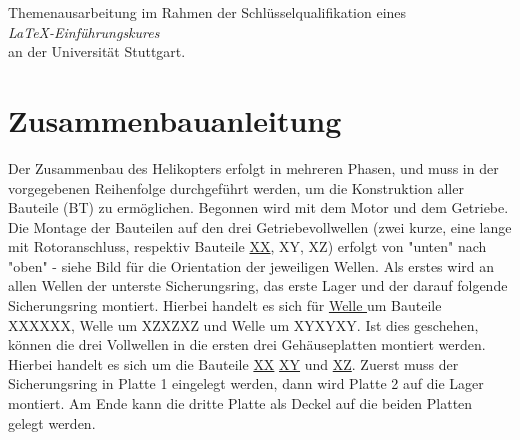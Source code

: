 \documentclass[11pt, a4paper]{scrartcl}
\newcommand*{\rom}[1]{\expandafter\uppercase\expandafter{\romannumeral #1 \relax}}
\begin{document}
\begin{center}
    Themenausarbeitung im Rahmen der Schlüsselqualifikation eines\\ \emph{\LaTeX-Einführungskures}\\ an der Universität Stuttgart.
    \vspace{1cm}\\
\end{center}

\tableofcontents

\section{Zusammenbauanleitung\label{AnleitungMain}}

Der Zusammenbau des Helikopters erfolgt in mehreren Phasen, und muss in der vorgegebenen Reihenfolge durchgeführt werden, um die Konstruktion aller Bauteile (BT) zu ermöglichen. Begonnen wird mit dem Motor und dem Getriebe. Die Montage der Bauteilen auf den drei Getriebevollwellen (zwei kurze, eine lange mit Rotoranschluss, respektiv Bauteile \hyperlink{Welle1}{XX}, XY, XZ) erfolgt von "unten" nach "oben" - siehe Bild %
für die Orientation der jeweiligen Wellen. Als erstes wird an allen Wellen der unterste Sicherungsring, das erste Lager und der darauf folgende Sicherungsring montiert. Hierbei handelt es sich für \hyperlink{Welle1}{Welle \rom{1}} um Bauteile XXXXXX, Welle  \rom{2} um XZXZXZ und Welle \rom{3} um XYXYXY. Ist dies geschehen, können die drei Vollwellen in die ersten drei Gehäuseplatten montiert werden. Hierbei handelt es sich um die Bauteile \hyperlink{list_Platte1}{XX}
\hyperlink{list_Platte1}{XY} und \hyperlink{list_Platte1}{XZ}. Zuerst muss der Sicherungsring in Platte 1 eingelegt werden, dann wird Platte 2 auf die Lager montiert. Am Ende kann die dritte Platte als Deckel auf die beiden Platten gelegt werden. 
\end{document}
